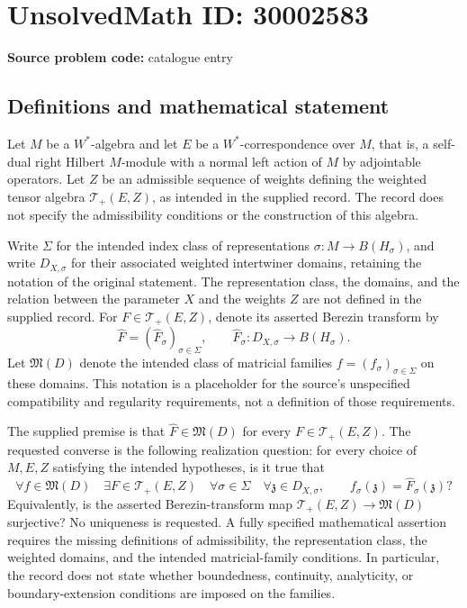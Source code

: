 \documentclass[11pt]{article}
\begin{document}
\section*{UnsolvedMath ID: 30002583}
\textbf{Source problem code:} catalogue entry
\subsection{Definitions and mathematical statement}
Let \(M\) be a \(W^*\)-algebra and let \(E\) be a \(W^*\)-correspondence over \(M\), that is, a self-dual right Hilbert \(M\)-module with a normal left action of \(M\) by adjointable operators. Let \(Z\) be an admissible sequence of weights defining the weighted tensor algebra \(\mathcal T_+(E,Z)\), as intended in the supplied record. The record does not specify the admissibility conditions or the construction of this algebra.

Write \(\Sigma\) for the intended index class of representations \(\sigma:M\to B(H_\sigma)\), and write \(D_{X,\sigma}\) for their associated weighted intertwiner domains, retaining the notation of the original statement. The representation class, the domains, and the relation between the parameter \(X\) and the weights \(Z\) are not defined in the supplied record. For \(F\in\mathcal T_+(E,Z)\), denote its asserted Berezin transform by
\[
\widehat F=(\widehat F_\sigma)_{\sigma\in\Sigma},\qquad
\widehat F_\sigma:D_{X,\sigma}\longrightarrow B(H_\sigma).
\]
Let \(\mathfrak M(D)\) denote the intended class of matricial families \(f=(f_\sigma)_{\sigma\in\Sigma}\) on these domains. This notation is a placeholder for the source's unspecified compatibility and regularity requirements, not a definition of those requirements.

The supplied premise is that \(\widehat F\in\mathfrak M(D)\) for every \(F\in\mathcal T_+(E,Z)\). The requested converse is the following realization question: for every choice of \(M,E,Z\) satisfying the intended hypotheses, is it true that
\[
\forall f\in\mathfrak M(D)\quad
\exists F\in\mathcal T_+(E,Z)\quad
\forall\sigma\in\Sigma\quad
\forall\mathfrak z\in D_{X,\sigma},\qquad
f_\sigma(\mathfrak z)=\widehat F_\sigma(\mathfrak z)?
\]
Equivalently, is the asserted Berezin-transform map \(\mathcal T_+(E,Z)\to\mathfrak M(D)\) surjective? No uniqueness is requested. A fully specified mathematical assertion requires the missing definitions of admissibility, the representation class, the weighted domains, and the intended matricial-family conditions. In particular, the record does not state whether boundedness, continuity, analyticity, or boundary-extension conditions are imposed on the families.
\end{document}
